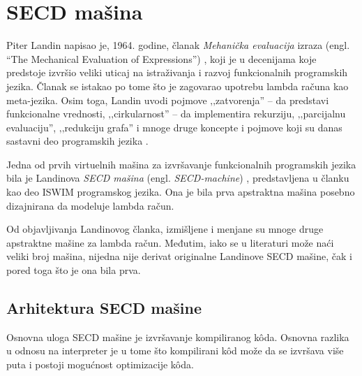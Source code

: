 \section{SECD mašina}
\label{sec:secd-masina}


Piter Landin napisao je, 1964. godine, članak {\em Mehanička evaluacija} izraza (engl. “The Mechanical Evaluation of Expressions”) \cite{landinsecd}, koji je u decenijama koje predstoje izvršio veliki uticaj na istraživanja i razvoj funkcionalnih programskih jezika. Članak se istakao po tome što je zagovarao upotrebu lambda računa kao meta-jezika. Osim toga, Landin uvodi pojmove ‚‚zatvorenja'' -- da predstavi funkcionalne vrednosti, ‚‚cirkularnost'' -- da implementira rekurziju, ‚‚parcijalnu evaluaciju'', ‚‚redukciju grafa'' i mnoge druge koncepte i pojmove koji su danas sastavni deo programskih jezika \cite{calls-lambda, compiler-design}.

Jedna od prvih virtuelnih mašina za izvršavanje funkcionalnih programskih jezika bila je Landinova {\em SECD mašina} (engl. \textit{SECD-machine}) \cite{landin-secd}, predstavljena u članku kao deo ISWIM \cite{ISWIM} programskog jezika. Ona je bila prva apstraktna mašina posebno dizajnirana da modeluje lambda račun.

Od objavljivanja Landinovog članka, izmišljene i menjane su mnoge druge apstraktne mašine za lambda račun. Međutim, iako se u literaturi može naći veliki broj mašina, nijedna nije derivat originalne Landinove SECD mašine, čak i pored toga što je ona bila prva.


\subsection{Arhitektura SECD mašine}

Osnovna uloga SECD mašine je izvršavanje kompiliranog k\^oda. Osnovna razlika u odnosu na interpreter je u tome što kompilirani k\^od može da se izvršava više puta i postoji mogućnost optimizacije k\^oda. 

